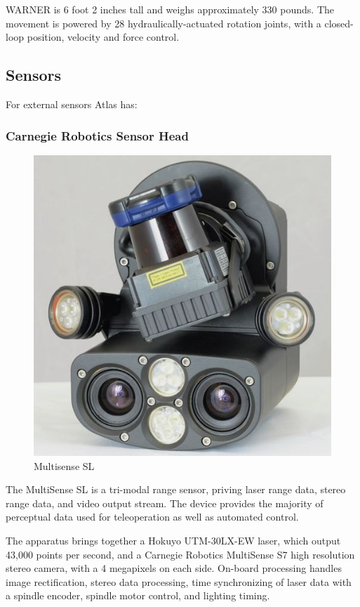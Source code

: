 \documentclass{article}
\begin{document}
WARNER is 6 foot 2 inches tall and weighs approximately 330 pounds. The movement is powered by 28 hydraulically-actuated rotation joints, with a closed-loop position, velocity and force control. 

\subsection{Sensors}

For external sensors Atlas has:

\subsubsection{Carnegie Robotics Sensor Head}
\begin{figure}
  \begin{center}
    \includegraphics[scale=0.25]{images/sensorhead.jpg}
  \end{center}
  \caption{Multisense SL}
\end{figure}


The MultiSense SL is a tri-modal range sensor, priving laser range data, stereo range data, and video output stream. The device provides the majority of perceptual data used for teleoperation as well as automated control. 

The apparatus brings together a Hokuyo UTM-30LX-EW laser, which output 43,000 points per second, and a Carnegie Robotics MultiSense S7 high resolution stereo camera, with a 4 megapixels on each side.  On-board processing handles image rectification, stereo data processing, time synchronizing of laser data with a spindle encoder, spindle motor control, and lighting timing. \cite{multisense-sl}
\end{document}
